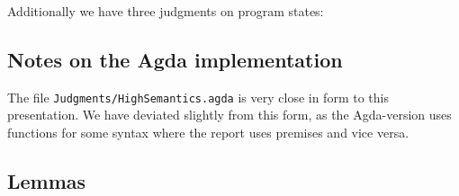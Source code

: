 
Additionally we have three judgments on program states:

\begin{mathpar}
\end{mathpar}

\begin{mathpar}
\end{mathpar}


\subsection{Notes on the Agda implementation}

The file \texttt{Judgments/HighSemantics.agda} is very close in form to this
presentation. We have deviated slightly from this form, as the Agda-version uses
functions for some syntax where the report uses premises and vice versa.

\subsection{Lemmas}


